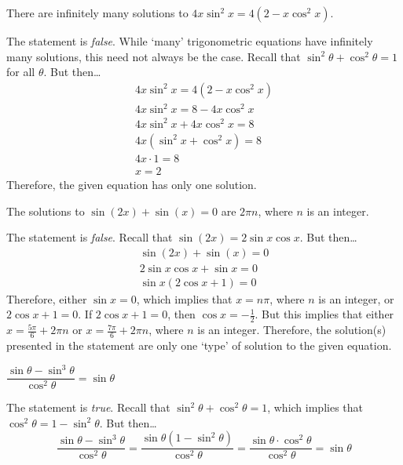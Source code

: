 \documentclass[11pt,letterpaper]{article}
\begin{document}
 There are infinitely many solutions to $4x \sin^2 x= 4(2 - x \cos^2 x)$. \pspace

\sol The statement is \textit{false}. While `many' trigonometric equations have infinitely many solutions, this need not always be the case. Recall that $\sin^2 \theta + \cos^2 \theta= 1$ for all $\theta$. But then\dots
	\[
	\begin{gathered}
	4x \sin^2 x= 4(2 - x \cos^2 x) \\[0.1cm]
	4x \sin^2 x= 8 - 4x \cos^2 x \\[0.1cm]
	4x \sin^2 x + 4x \cos^2 x= 8 \\[0.1cm]
	4x \left( \sin^2 x + \cos^2 x \right)= 8 \\[0.1cm]
	4x \cdot 1= 8 \\[0.1cm]
	x= 2
	\end{gathered}
	\]
Therefore, the given equation has only one solution. \pvspace{1.3cm}



 The solutions to $\sin(2x) + \sin(x)= 0$ are $2\pi n$, where $n$ is an integer. \pspace

\sol The statement is \textit{false}. Recall that $\sin(2x)= 2 \sin x \cos x$. But then\dots
	\[
	\begin{gathered}
	\sin(2x) + \sin(x)= 0 \\[0.1cm]
	2 \sin x \cos x + \sin x= 0 \\[0.1cm]
	\sin x (2 \cos x + 1)= 0 
	\end{gathered}
	\]
Therefore, either $\sin x= 0$, which implies that $x= n \pi$, where $n$ is an integer, or $2 \cos x + 1=0 $. If $2 \cos x + 1= 0$, then $\cos x= -\frac{1}{2}$. But this implies that either $x= \frac{5\pi}{6} + 2\pi n$ or $x= \frac{7\pi}{6} + 2\pi n$, where $n$ is an integer. Therefore, the solution(s) presented in the statement are only one `type' of solution to the given equation. \pvspace{1.3cm}



\newpage



 $\dfrac{\sin \theta - \sin^3 \theta}{\cos^2 \theta}= \sin \theta$ \pspace

\sol The statement is \textit{true}. Recall that $\sin^2 \theta + \cos^2 \theta= 1$, which implies that $\cos^2 \theta= 1 - \sin^2 \theta$. But then\dots
	\[
	\dfrac{\sin \theta - \sin^3 \theta}{\cos^2 \theta}= \dfrac{\sin \theta (1 - \sin^2 \theta)}{\cos^2 \theta}= \dfrac{\sin \theta \cdot \cos^2 \theta}{\cos^2 \theta}= \sin \theta
	\] \pvspace{1.3cm}
\end{document}
